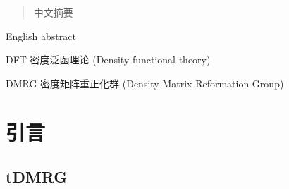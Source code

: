 \documentclass[
    ]{njuthesis}
\begin{document}

\maketitle



\begin{abstract}
    中文摘要
\end{abstract}

\begin{abstract*}
    English abstract
\end{abstract*}

\tableofcontents
\listoffigures
\listoftables

\mainmatter

\begin{notation}[10cm]
  \item[DFT] 密度泛函理论 (Density functional theory)
  \item[DMRG] 密度矩阵重正化群 (Density-Matrix Reformation-Group)
\end{notation}

%   
%   

\chapter{引言}

\section{tDMRG}
\end{document}
